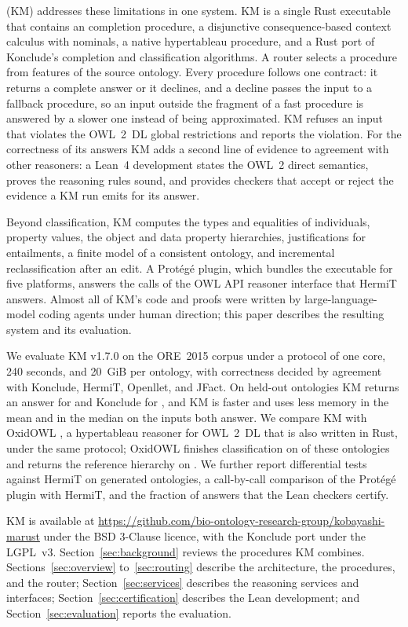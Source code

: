 \KM{} (KM) addresses these limitations in one system.  KM is a single Rust
executable that contains an \EL{} completion procedure, a disjunctive
consequence-based context calculus with nominals, a native hypertableau
procedure, and a Rust port of Konclude's completion and classification
algorithms.  A router selects a procedure from features of the source
ontology.  Every procedure follows one contract: it returns a complete answer
or it declines, and a decline passes the input to a fallback procedure, so an
input outside the fragment of a fast procedure is answered by a slower one
instead of being approximated.  KM refuses an input that violates the OWL~2~DL
global restrictions and reports the violation.  For the correctness of its
answers KM adds a second line of evidence to agreement with other reasoners:
a Lean~4 development \cite{demoura2021lean4} states the OWL~2 direct
semantics, proves the reasoning rules sound, and provides checkers that accept
or reject the evidence a KM run emits for its answer.

Beyond classification, KM computes the types and equalities of individuals,
property values, the object and data property hierarchies, justifications for
entailments, a finite model of a consistent ontology, and incremental
reclassification after an edit.  A Prot\'eg\'e plugin, which bundles the
executable for five platforms, answers the calls of the OWL API reasoner
interface that HermiT answers.  Almost all of KM's code and proofs were
written by large-language-model coding agents under human direction; this
paper describes the resulting system and its evaluation.

We evaluate KM v1.7.0 on the ORE~2015 corpus \cite{parsia2017ore} under a
protocol of one core, 240 seconds, and 20~GiB per ontology, with correctness
decided by agreement with Konclude, HermiT, Openllet, and JFact.  On
\HOInputs{} held-out ontologies KM returns an answer for \HOKMSolved{} and Konclude
for \HOKCSolved{}, and KM is faster and uses less memory in the mean and in the
median on the inputs both answer.  We compare KM with OxidOWL
\cite{sieve2026oxidowlcodingagents}, a hypertableau reasoner for OWL~2~DL
that is also written in Rust, under the same protocol; OxidOWL finishes
classification on \OXFinished{} of these ontologies and returns the reference
hierarchy on \OXHierarchyCorrect.  We further report
differential tests against HermiT on generated ontologies, a call-by-call
comparison of the Prot\'eg\'e plugin with HermiT, and the fraction of answers
that the Lean checkers certify.

KM is available at
\url{https://github.com/bio-ontology-research-group/kobayashi-marust} under
the BSD 3-Clause licence, with the Konclude port under the LGPL~v3.
Section~\ref{sec:background} reviews the procedures KM combines.
Sections~\ref{sec:overview} to~\ref{sec:routing} describe the architecture,
the procedures, and the router; Section~\ref{sec:services} describes the
reasoning services and interfaces; Section~\ref{sec:certification} describes
the Lean development; and Section~\ref{sec:evaluation} reports the
evaluation.
